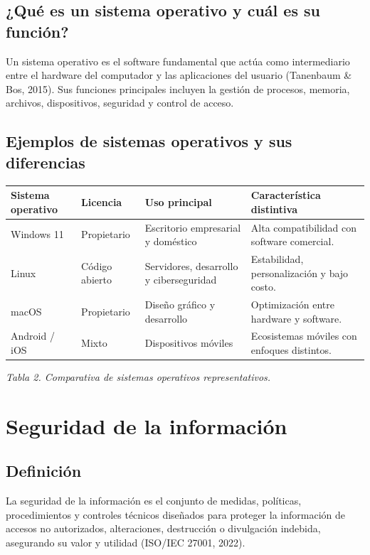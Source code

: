 \documentclass[12pt,a4paper]{article}
\begin{document}
	\subsection{¿Qué es un sistema operativo y cuál es su función?}
	
	Un sistema operativo es el software fundamental que actúa como intermediario entre el hardware del computador y las aplicaciones del usuario (Tanenbaum \& Bos, 2015). Sus funciones principales incluyen la gestión de procesos, memoria, archivos, dispositivos, seguridad y control de acceso.
	
	\subsection{Ejemplos de sistemas operativos y sus diferencias}
	
	\begin{center}
		\begin{tabular}{|p{3cm}|p{3cm}|p{4cm}|p{4cm}|}
			\hline
			\textbf{Sistema operativo} & \textbf{Licencia} & \textbf{Uso principal} & \textbf{Característica distintiva} \\ \hline
			Windows 11 & Propietario & Escritorio empresarial y doméstico & Alta compatibilidad con software comercial. \\ \hline
			Linux & Código abierto & Servidores, desarrollo y ciberseguridad & Estabilidad, personalización y bajo costo. \\ \hline
			macOS & Propietario & Diseño gráfico y desarrollo & Optimización entre hardware y software. \\ \hline
			Android / iOS & Mixto & Dispositivos móviles & Ecosistemas móviles con enfoques distintos. \\ \hline
		\end{tabular}
		
		\textit{Tabla 2. Comparativa de sistemas operativos representativos.}
	\end{center}
	
	\section{Seguridad de la información}
	
	\subsection{Definición}
	
	La seguridad de la información es el conjunto de medidas, políticas, procedimientos y controles técnicos diseñados para proteger la información de accesos no autorizados, alteraciones, destrucción o divulgación indebida, asegurando su valor y utilidad (ISO/IEC 27001, 2022).
	
\end{document}
